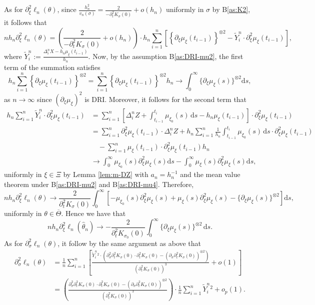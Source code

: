\documentclass[a4paper,10pt,twoside]{article}
\numberwithin{equation}{section}
\def\D{\Delta}
\def\l{\left}
\def\r{\right}
\def\s{\sigma}
\def\p{\partial}
\def\wh#1{\widehat{#1}}
\def\df{\mathrm{d}}
\begin{document}
As for $\p_\xi^2 \ell_n(\theta)$, since $\frac{h_n^2}{v_n(\sigma)} = \frac{2}{-\p_t^2 K_\sigma(0)} + o(h_n)$ uniformly in $\s$ by B\ref{as:K2}, 
it follows that 
\[
nh_n\p_\xi^2 \ell_n(\theta) 
= \l( \frac{2}{-\p_t^2 K_\sigma(0)} + o(h_n) \r) \cdot h_n\sum_{i=1}^n \l[\l\{ \p_\xi \mu_\xi(t_{i-1}) \r\}^{\otimes 2} - \widetilde{Y}_i^n \cdot \p_\xi^2 \mu_\xi(t_{i-1})\r],
\]
where $\widetilde{Y}_i^n := \frac{ \Delta_i^n X - h_n \mu_\xi(t_{i-1}) }{h_n}$.
Now, by the assumption B\ref{as:DRI-mu2}, the first term of the summation satisfies
\[
h_n\sum_{i=1}^n \l\{ \p_\xi \mu_\xi(t_{i-1}) \r\}^{\otimes 2}  =  \sum_{i=1}^n \l\{ \p_\xi \mu_\xi(t_{i-1}) \r\}^{\otimes 2}h_n   
\to \int_0^\infty \{ \p_\xi \mu_\xi(s) \}^{\otimes 2}\df s, 
\]
as $n\to \infty$ since $(\p_\xi \mu_\xi)^2$ is DRI. Moreover, it follows for the second term that 
\begin{align*}
h_n\sum_{i=1}^n \widetilde{Y}_i^n \cdot \p_\xi^2 \mu_\xi(t_{i-1}) 
&=\sum_{i=1}^n\l[\D_i^n Z + \int_{t_{i-1}}^{t_i}\mu_{\xi_0}(s)\,\df s - h_n \mu_\xi(t_{i-1})  \r]  \cdot \p_\xi^2 \mu_\xi(t_{i-1}) \\
&= \sum_{i=1}^n \p_\xi^2 \mu_\xi(t_{i-1})  \cdot \D_i^nZ 
+ h_n \sum_{i=1}^n \frac{1}{h_n}\int_{t_{i-1}}^{t_i}\mu_{\xi_0}(s)\,\df s  \cdot \p_\xi^2 \mu_\xi(t_{i-1}) \\
&\quad -  \sum_{i=1}^n \mu_\xi(t_{i-1})  \cdot \p_\xi^2 \mu_\xi(t_{i-1}) h_n \\
&\to  \int_0^\infty \mu_{\xi_0}(s) \p_\xi^2 \mu_\xi(s) \df s - \int_0^\infty \mu_\xi(s) \p_\xi^2 \mu_\xi(s) \df s, 
\end{align*}
uniformly in $\xi \in \Xi$ by Lemma \ref{lem:m-DZ} with $a_n=h_n^{-1}$ and the mean value theorem under B\ref{as:DRI-mu2} and B\ref{as:DRI-mu4}. Therefore,
\[
nh_n\p_\xi^2 \ell_n(\theta) \to \frac{2}{\p_t^2 K_\sigma(0)} \int_0^\infty \l[- \mu_{\xi_0}(s) \p_\xi^2 \mu_\xi(s)  + \mu_\xi(s) \p_\xi^2 \mu_\xi(s) -  \{ \p_\xi \mu_\xi(s) \}^{\otimes 2}\r] \df s, 
\]
uniformly in $\theta \in \overline{\Theta}$. Hence we have that 
\[
nh_n \p_\xi^2 \ell_n(\wh{\theta}_n) \to - \frac{2}{\p_t^2 K_{\sigma_0}(0)}  \int_0^\infty \{ \p_\xi \mu_\xi(s) \}^{\otimes 2}\,\df s.
\]
As for $\p_\sigma^2 \ell_n(\theta)$, it follow by the same argument as above that 
\begin{align*}
\partial_\sigma^2 \ell_n(\theta)
&= \frac{1}{n} \sum_{i=1}^n \l[
\frac{ \widetilde{Y}_i^n{}^2 \cdot \l( \partial_\sigma^2 \partial_t^2 K_\sigma(0) \cdot \partial_t^2 K_\sigma(0) 
- \l( \partial_\sigma \partial_t^2 K_\sigma(0) \r)^{\otimes 2} \r) }
{ \l( \partial_t^2 K_\sigma(0) \r)^3 } + o(1)
\r] \\
&= \l( \frac{ \partial_\sigma^2 \partial_t^2 K_\sigma(0) \cdot \partial_t^2 K_\sigma(0)
- \l( \partial_\sigma \partial_t^2 K_\sigma(0) \r)^{\otimes 2} }{ \l( \partial_t^2 K_\sigma(0) \r)^3 } \r)
\cdot \frac{1}{n} \sum_{i=1}^n \widetilde{Y}_i^n{}^2 + o_p(1).
\end{align*}
\end{document}
